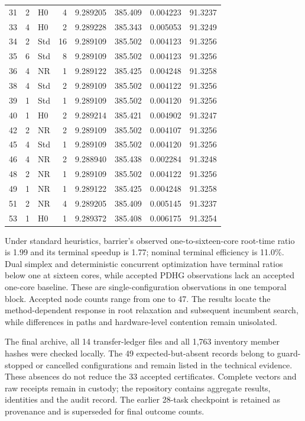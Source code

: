 \documentclass[
  english,
  11pt,
  a4paper,
]{article}
\begin{document}
\begin{longtable}{@{}rrlr rrrr@{}}
31 & 2 & H0 & 4 & 9.289205 & 385.409 & 0.004223 & 91.3237\\
33 & 4 & H0 & 2 & 9.289228 & 385.343 & 0.005053 & 91.3249\\
34 & 2 & Std & 16 & 9.289109 & 385.502 & 0.004123 & 91.3256\\
35 & 6 & Std & 8 & 9.289109 & 385.502 & 0.004123 & 91.3256\\
36 & 4 & NR & 1 & 9.289122 & 385.425 & 0.004248 & 91.3258\\
38 & 4 & Std & 2 & 9.289109 & 385.502 & 0.004122 & 91.3256\\
39 & 1 & Std & 1 & 9.289109 & 385.502 & 0.004120 & 91.3256\\
40 & 1 & H0 & 2 & 9.289214 & 385.421 & 0.004902 & 91.3247\\
42 & 2 & NR & 2 & 9.289109 & 385.502 & 0.004107 & 91.3256\\
45 & 4 & Std & 1 & 9.289109 & 385.502 & 0.004120 & 91.3256\\
46 & 4 & NR & 2 & 9.288940 & 385.438 & 0.002284 & 91.3248\\
48 & 2 & NR & 1 & 9.289109 & 385.502 & 0.004122 & 91.3256\\
49 & 1 & NR & 1 & 9.289122 & 385.425 & 0.004248 & 91.3258\\
51 & 2 & NR & 4 & 9.289205 & 385.409 & 0.005145 & 91.3237\\
53 & 1 & H0 & 1 & 9.289372 & 385.408 & 0.006175 & 91.3254\\
\bottomrule\end{longtable}\endgroup

Under standard heuristics, barrier's observed one-to-sixteen-core root-time ratio is 1.99 and its terminal speedup is 1.77; nominal terminal efficiency is 11.0\%. Dual simplex and deterministic concurrent optimization have terminal ratios below one at sixteen cores, while accepted PDHG observations lack an accepted one-core baseline. These are single-configuration observations in one temporal block. Accepted node counts range from one to 47. The results locate the method-dependent response in root relaxation and subsequent incumbent search, while differences in paths and hardware-level contention remain unisolated.

The final archive, all 14 transfer-ledger files and all 1,763 inventory member hashes were checked locally. The 49 expected-but-absent records belong to guard-stopped or cancelled configurations and remain listed in the technical evidence. These absences do not reduce the 33 accepted certificates. Complete vectors and raw receipts remain in custody; the repository contains aggregate results, identities and the audit record. The earlier 28-task checkpoint is retained as provenance and is superseded for final outcome counts.
\end{document}
